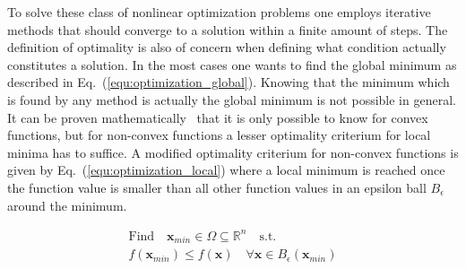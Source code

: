 \documentclass[a4paper,10pt]{article}
\renewcommand{\vec}[1]{\mathbf{#1}}
\newcommand{\equref}[1]{Eq.~(\ref{#1})}
\begin{document}
    To solve these class of nonlinear optimization problems one employs
    iterative methods that should converge to a solution within a
    finite amount of steps.
    The definition of optimality is also of concern when defining
    what condition actually constitutes a solution.
    In the most cases one wants to find the global minimum as described
    in \equref{equ:optimization_global}.
    Knowing that the minimum which is found by any method is actually
    the global minimum is not possible in general.
    It can be proven mathematically~\cite{solomon_numerical} that it is only possible to know
    for convex functions, but for non-convex
    functions a lesser optimality criterium for local minima has to suffice.
    A modified optimality criterium for non-convex functions is given
    by \equref{equ:optimization_local} where a local minimum is reached
    once the function value is smaller than all other function values 
    in an epsilon ball $B_{\epsilon}$ around the minimum.

    \begin{equation}
        \label{equ:optimization_local}
        \begin{gathered}
        \text{Find} \quad \vec{x}_{min} \in \Omega \subseteq \mathbb{R}^n \quad \text{s.t.}\\
        f(\vec{x}_{min}) \leq f(\vec{x}) \quad \forall \vec{x} \in B_{\epsilon}(\vec{x}_{min})
        \end{gathered} 
    \end{equation}
\end{document}
